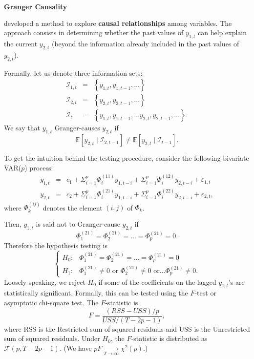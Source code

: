 \documentclass[
  12pt,
]{book}
\theoremstyle{definition}
\theoremstyle{definition}
\theoremstyle{definition}
\theoremstyle{definition}
\theoremstyle{remark}
\begin{document}
\textbf{Granger Causality}

\citet{Granger_1969} developed a method to explore \textbf{causal relationships} among variables. The approach consists in determining whether the past values of \(y_{1,t}\) can help explain the current \(y_{2,t}\) (beyond the information already included in the past values of \(y_{2,t}\)).

Formally, let us denote three information sets:
\begin{eqnarray*}
\mathcal{I}_{1,t} & = & \left\{ y_{1,t},y_{1,t-1},\ldots\right\} \\
\mathcal{I}_{2,t} & = & \left\{ y_{2,t},y_{2,t-1},\ldots\right\} \\
\mathcal{I}_{t} & = & \left\{ y_{1,t},y_{1,t-1},\ldots y_{2,t},y_{2,t-1},\ldots\right\}.
\end{eqnarray*}
We say that \(y_{1,t}\) Granger-causes \(y_{2,t}\) if
\[
\mathbb{E}\left[y_{2,t}\mid \mathcal{I}_{2,t-1}\right]\neq \mathbb{E}\left[y_{2,t}\mid \mathcal{I}_{t-1}\right].
\]

To get the intuition behind the testing procedure, consider the following
bivariate VAR(\(p\)) process:
\begin{eqnarray*}
y_{1,t} & = & c_1+\Sigma_{i=1}^{p}\Phi_i^{(11)}y_{1,t-i}+\Sigma_{i=1}^{p}\Phi_i^{(12)}y_{2,t-i}+\varepsilon_{1,t}\\
y_{2,t} & = & c_2+\Sigma_{i=1}^{p}\Phi_i^{(21)}y_{1,t-i}+\Sigma_{i=1}^{p}\Phi_i^{(22)}y_{2,t-i}+\varepsilon_{2,t},
\end{eqnarray*}
where \(\Phi_k^{(ij)}\) denotes the element \((i,j)\) of \(\Phi_k\).

Then, \(y_{1,t}\) is said not to Granger-cause \(y_{2,t}\) if
\[
\Phi_1^{(21)}=\Phi_2^{(21)}=\ldots=\Phi_p^{(21)}=0.
\]
Therefore the hypothesis testing is
\[
\begin{cases}
H_{0}: & \Phi_1^{(21)}=\Phi_2^{(21)}=\ldots=\Phi_p^{(21)}=0\\
H_{1}: & \Phi_1^{(21)}\neq0\mbox{ or }\Phi_2^{(21)}\neq0\mbox{ or}\ldots\Phi_p^{(21)}\neq0.\end{cases}
\]
Loosely speaking, we reject \(H_{0}\) if some of the coefficients on the lagged \(y_{1,t}\)'s are statistically significant. Formally, this can be tested using the \(F\)-test or asymptotic chi-square test. The \(F\)-statistic is
\[
F=\frac{(RSS-USS)/p}{USS/(T-2p-1)},
\]
where RSS is the Restricted sum of squared residuals and USS is the Unrestricted sum of squared residuals. Under \(H_{0}\), the \(F\)-statistic is distributed as \(\mathcal{F}(p,T-2p-1)\). (We have \(pF\underset{T \rightarrow \infty}{\rightarrow}\chi^{2}(p)\).)
\end{document}
